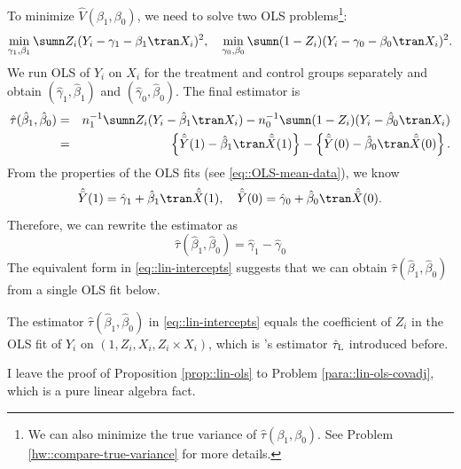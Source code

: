 To minimize $\hat{V}( \beta_1, \beta_0 )$, we need to solve two OLS problems\footnote{
We can also minimize the true variance of $\hat{\tau}(\beta_1, \beta_0) $. 
See Problem \ref{hw::compare-true-variance} for more details. 
}:
$$
\min_{\gamma_1 , \beta_1 }
\sumn Z_i  ( Y_i - \gamma_1 - \beta_1\tran  X_i )^2,\quad
\min_{\gamma_0 , \beta_0 }
\sumn (1-Z_i)  ( Y_i - \gamma_0 - \beta_0\tran  X_i  )^2.
$$
We run OLS of $Y_i$ on $X_i$ for the treatment and control groups separately and obtain $( \hat{\gamma}_1, \hat{\beta}_1 )$ and $( \hat{\gamma}_0, \hat{\beta}_0 )$. The final estimator is
\begin{eqnarray*}
 \hat{\tau}( \hat{\beta}_1, \hat{\beta}_0) &=& n_1^{-1} \sumn Z_i(Y_i - \hat{\beta}_1\tran  X_i) 
- n_0^{-1} \sumn (1-Z_i)  (Y_i - \hat{\beta}_0\tran  X_i) \\
&=&\left\{  \hat{\bar{Y}}(1) - \hat \beta_1\tran \hat{\bar{X} }(1) \right\}  
-  \left\{   \hat{\bar{Y}}(0) - \hat \beta_0\tran \hat{\bar{X} }(0) \right\} . 
\end{eqnarray*}
From the properties of the OLS fits (see \eqref{eq::OLS-mean-data}), we know
$$
\hat{\bar{Y}}(1) =  \hat{\gamma}_1 + \hat{\beta}_1\tran  \hat{\bar{X} }(1),\quad
\hat{\bar{Y}}(0) =  \hat{\gamma}_0 + \hat{\beta}_0\tran  \hat{\bar{X} }(0).
$$
Therefore, we can rewrite the estimator as
\begin{equation}
\label{eq::lin-intercepts}
 \hat{\tau}( \hat{\beta}_1, \hat{\beta}_0)  =  \hat{\gamma}_1 - \hat{\gamma}_0  
\end{equation}
The equivalent form in \eqref{eq::lin-intercepts} suggests that we can obtain $ \hat{\tau}( \hat{\beta}_1, \hat{\beta}_0) $ from a single OLS fit below.




\begin{proposition}\label{prop::lin-ols}
The estimator $ \hat{\tau}( \hat{\beta}_1, \hat{\beta}_0) $ in \eqref{eq::lin-intercepts} equals the coefficient of $Z_i$ in the OLS fit of $Y_i$ on $(1, Z_i, X_i, Z_i\times X_i)$, which is \citet{lin2013}'s estimator $\hat{\tau}_\textsc{L}$ introduced before. 
\end{proposition}

I leave the proof of Proposition \ref{prop::lin-ols} to Problem \ref{para::lin-ols-covadj}, which is a pure linear algebra fact. 


